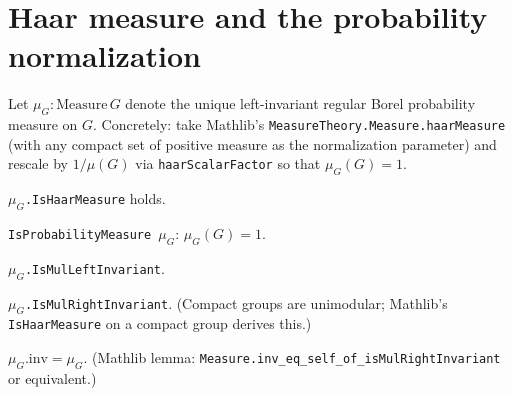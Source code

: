\section{Haar measure and the probability normalization}

\begin{definition}
  \label{def:haar-prob}
  \leanok
  Let $\mu_G : \mathrm{Measure}\,G$ denote the unique left-invariant regular
  Borel probability measure on $G$. Concretely: take Mathlib's
  \texttt{MeasureTheory.Measure.haarMeasure} (with any compact set of
  positive measure as the normalization parameter) and rescale by
  $1 / \mu(G)$ via \texttt{haarScalarFactor} so that $\mu_G(G) = 1$.
\end{definition}

\begin{theorem}
  \label{thm:haar-isHaar}
  \mathlibok
  \leanok
  \texttt{$\mu_G$.IsHaarMeasure} holds.
\end{theorem}

\begin{theorem}
  \label{thm:haar-isProb}
  \leanok
  \texttt{IsProbabilityMeasure $\mu_G$}: $\mu_G(G) = 1$.
\end{theorem}

\begin{theorem}
  \label{thm:haar-leftInv}
  \mathlibok
  \leanok
  \texttt{$\mu_G$.IsMulLeftInvariant}.
\end{theorem}

\begin{theorem}
  \label{thm:haar-rightInv}
  \mathlibok
  \leanok
  \texttt{$\mu_G$.IsMulRightInvariant}. (Compact groups are unimodular;
  Mathlib's \texttt{IsHaarMeasure} on a compact group derives this.)
\end{theorem}

\begin{theorem}
  \label{thm:haar-inv}
  \mathlibok
  \leanok
  $\mu_G.\mathrm{inv} = \mu_G$. (Mathlib lemma:
  \texttt{Measure.inv\_eq\_self\_of\_isMulRightInvariant} or equivalent.)
\end{theorem}

